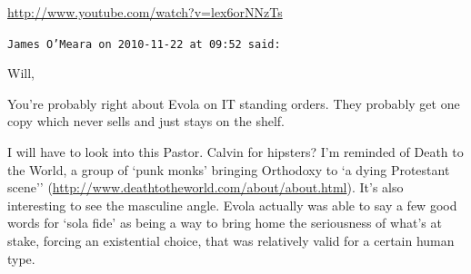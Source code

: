 \begin{footnotesize}
\begin{sffamily}
\url{http://www.youtube.com/watch?v=lex6orNNzTs}


\hfill

\texttt{James O'Meara on 2010-11-22 at 09:52 said:}

Will,

You're probably right about Evola on IT standing orders. They probably get one copy which never sells and just stays on the shelf.

I will have to look into this Pastor. Calvin for hipsters? I'm reminded of Death to the World, a group of `punk monks' bringing Orthodoxy to `a dying Protestant scene'' (\url{http://www.deathtotheworld.com/about/about.html}). It's also interesting to see the masculine angle. Evola actually was able to say a few good words for `sola fide' as being a way to bring home the seriousness of what's at stake, forcing an existential choice, that was relatively valid for a certain human type.

\end{sffamily}
\end{footnotesize}

